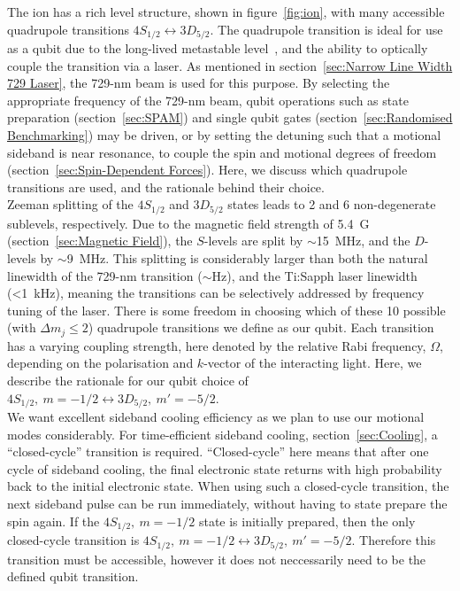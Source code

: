     The \ca ion has a rich level structure, shown in figure~\ref{fig:ion}, with many accessible quadrupole transitions $4S_{1/2}\leftrightarrow 3D_{5/2}$. The quadrupole transition is ideal for use as a qubit due to the long-lived metastable level~\cite{barton_measurement_2000}, and the ability to optically couple the transition via a laser. As mentioned in section~\ref{sec:Narrow Line Width 729 Laser}, the 729-nm beam is used for this purpose. By selecting the appropriate frequency of the 729-nm beam, qubit operations such as state preparation (section~\ref{sec:SPAM}) and single qubit gates (section~\ref{sec:Randomised Benchmarking}) may be driven, or by setting the detuning such that a motional sideband is near resonance, to couple the spin and motional degrees of freedom (section~\ref{sec:Spin-Dependent Forces}). Here, we discuss which quadrupole transitions are used, and the rationale behind their choice.\\ 
    Zeeman splitting of the $4S_{1/2}$ and $3D_{5/2}$ states leads to 2 and 6
    non-degenerate sublevels, respectively. Due to the magnetic field strength of 5.4~G (section~\ref{sec:Magnetic Field}),
    the $S$-levels are split by $\sim$15~MHz, and the $D$-levels by $\sim$9~MHz.
    This splitting is considerably larger than both the natural linewidth of the
    729-nm transition ($\sim$Hz), and the Ti:Sapph laser linewidth (<1~kHz), meaning the transitions can be 
    selectively addressed by frequency tuning of the laser. There is some freedom in choosing which of these 10 possible (with $\Delta m_j \leq 2$) quadrupole transitions we define as our qubit. Each transition has a varying coupling strength, here denoted by the relative Rabi frequency, $\Omega$, depending on the polarisation and $k$-vector of the interacting light. Here, we describe the rationale for our qubit choice of $4S_{1/2},~m = -1/2 \leftrightarrow 3D_{5/2}, ~m' = -5/2$.\\
     We want excellent sideband cooling efficiency as we plan to use our motional modes considerably. For time-efficient sideband cooling, section~\ref{sec:Cooling}, a ``closed-cycle'' transition is required. ``Closed-cycle'' here means that after one cycle of sideband cooling, the final electronic state returns with high probability back to the initial electronic state. When using such a closed-cycle transition, the next sideband pulse can be run immediately, without having to state prepare the spin again. If the $4S_{1/2},~m = -1/2$ state is initially prepared, then the only closed-cycle transition is $4S_{1/2},~m = -1/2 \leftrightarrow 3D_{5/2},~m' = -5/2$. Therefore this transition must be accessible, however it does not neccessarily need to be the defined qubit transition. \\
